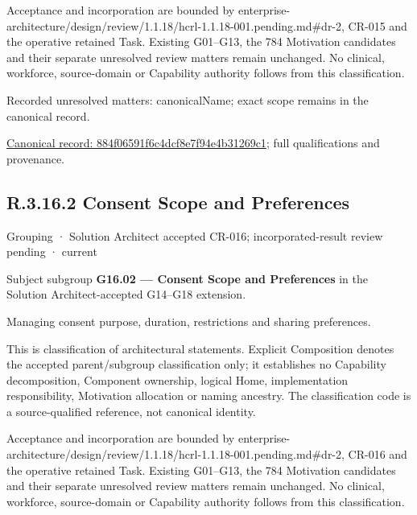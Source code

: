 Acceptance and incorporation are bounded by enterprise-architecture/design/review/1.1.18/hcrl-1.1.18-001.pending.md\#dr-2, CR-015 and the operative retained Task. Existing G01–G13, the 784 Motivation candidates and their separate unresolved review matters remain unchanged. No clinical, workforce, source-domain or Capability authority follows from this classification.


{\small Recorded unresolved matters: canonicalName; exact scope remains in the canonical record.}\par
{\footnotesize \href{../../../../continuum/grouping/884f06591f6c4dcf8e7f94e4b31269c1.md}{Canonical record: 884f06591f6c4dcf8e7f94e4b31269c1}; full qualifications and provenance.}\par
\subsection*{R.3.16.2 Consent Scope and Preferences}
\label{navigation:R.3.16.2}

\label{element:e48346674b0740c19f4a13cc50a7ae66}
{\small Grouping · Solution Architect accepted CR-016; incorporated-result review pending · current}\par

Subject subgroup \textbf{G16.02 — Consent Scope and Preferences} in the Solution Architect-accepted G14–G18 extension.



Managing consent purpose, duration, restrictions and sharing preferences.



This is classification of architectural statements. Explicit Composition denotes the accepted parent/subgroup classification only; it establishes no Capability decomposition, Component ownership, logical Home, implementation responsibility, Motivation allocation or naming ancestry. The classification code is a source-qualified reference, not canonical identity.



Acceptance and incorporation are bounded by enterprise-architecture/design/review/1.1.18/hcrl-1.1.18-001.pending.md\#dr-2, CR-016 and the operative retained Task. Existing G01–G13, the 784 Motivation candidates and their separate unresolved review matters remain unchanged. No clinical, workforce, source-domain or Capability authority follows from this classification.


